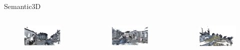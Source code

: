 \documentclass[aspectratio=169]{beamer}
\begin{document}
\begin{frame}{Semantic3D}
    \begin{columns}
        \begin{column}{0.33\textwidth}
            \begin{figure}
                \centering
                \includegraphics[scale=0.33]{images/sem3d/sem3d_sample_1.jpg}
            \end{figure}
        \end{column}
        \begin{column}{0.33\textwidth}
            \begin{figure}
                \centering
                \includegraphics[scale=0.33]{images/sem3d/sem3d_sample_2.jpg}   
            \end{figure}
        \end{column}
        \begin{column}{0.33\textwidth}
            \begin{figure}
                \centering
                \includegraphics[scale=0.33]{images/sem3d/sem3d_sample_3.jpg}

\end{figure}
\end{column}
\end{columns}
\end{frame}
\end{document}
